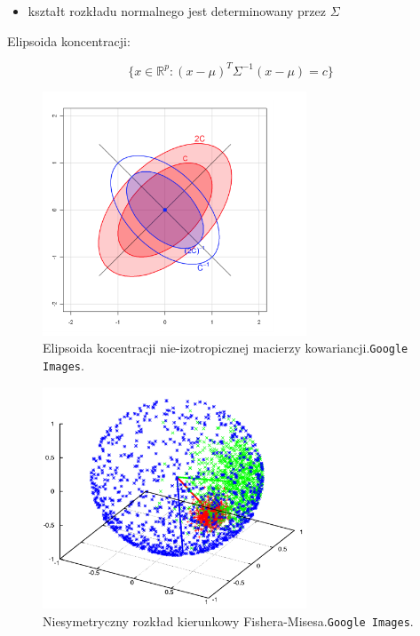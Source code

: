 \documentclass[slidescentered]{beamer}
\begin{document}
\begin{frame}
	\begin{itemize}
		\item kształt rozkładu normalnego jest determinowany przez $\Sigma$
	\end{itemize}

	\pause Elipsoida koncentracji: 

	 \begin{equation}
		 \{x \in \mathbb{R}^{p}: (x-\mu)^{T}\Sigma^{-1}(x-\mu) = c \}
	 \end{equation}
\end{frame}
\begin{frame}
	\begin{figure}[H]
		\centering
		\includegraphics[width=0.7\textwidth, height=0.7\textheight]{./elipse-cov.png}
		\caption{Elipsoida kocentracji nie-izotropicznej macierzy kowariancji.\texttt{Google Images}.}
	\end{figure}
\end{frame}

\begin{frame}
	\begin{figure}[H]
		\centering
		\includegraphics[width=0.7\textwidth, height=0.7\textheight]{./von-mises.png}
		\caption{Niesymetryczny rozkład kierunkowy Fishera-Misesa.\texttt{Google Images}.}
	\end{figure}
\end{frame}
\end{document}
